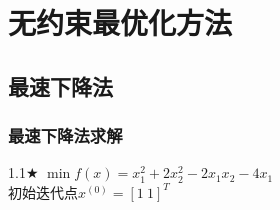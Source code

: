 \section{无约束最优化方法}

\subsection{最速下降法}

\subsubsection{最速下降法求解}

\begin{problem}{1.1$\bigstar$}
    $\min f(x)=x_1^2+2x_2^2-2x_1x_2-4x_1$\\
    初始迭代点${x^{(0)}}=[1\ 1]^T$
\end{problem}
